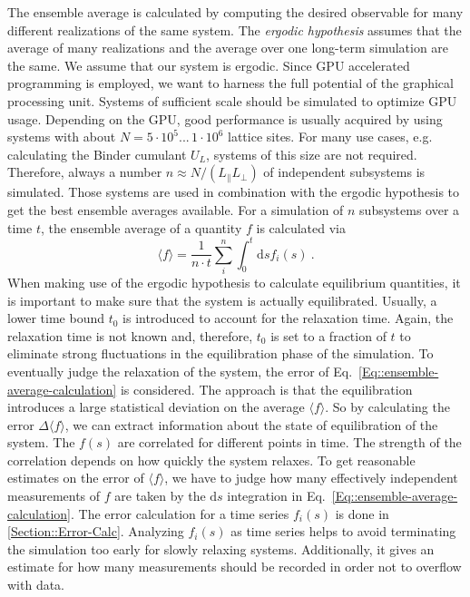 	The ensemble average is calculated by computing the desired observable for many different realizations of the same system. The \textit{ergodic hypothesis} assumes that the average of many realizations and the average over one long-term simulation are the same. We assume that our system is ergodic. Since GPU accelerated programming is employed, we want to harness the full potential of the graphical processing unit. Systems of sufficient scale should be simulated to optimize GPU usage. Depending on the GPU, good performance is usually acquired by using systems with about $N=  5 \cdot 10^5...\,1 \cdot 10^6$ lattice sites. For many use cases, e.g. calculating the Binder cumulant $U_L$, systems of this size are not required. Therefore, always a number $n \approx	N /	(L_\parallel L_\perp)$ of independent subsystems is simulated. Those systems are used in combination with the ergodic hypothesis to get the best ensemble averages available. For a simulation of $n$ subsystems over a time $t$, the ensemble average of a quantity $f$ is calculated via
	\begin{equation} \label{Eq::ensemble-average-calculation}
		\langle f \rangle = \frac{1}{n \cdot t} \sum_i^n \int_0^{t} \text{d}s f_i(s)~.
	\end{equation}
	 When making use of the ergodic hypothesis to calculate equilibrium quantities, it is important to make sure that the system is actually equilibrated. Usually, a lower time bound $t_0$ is introduced to account for the relaxation time. Again, the relaxation time is not known and, therefore, $t_0$ is set to a fraction of $t$ to eliminate strong fluctuations in the equilibration phase of the simulation. To eventually judge the relaxation of the system, the error of Eq.~\eqref{Eq::ensemble-average-calculation} is considered. The approach is that the equilibration introduces a large statistical deviation on the average $\langle f \rangle$. So by calculating the error $\Delta \langle f \rangle $, we can extract information about the state of equilibration of the system. The $f(s)$ are correlated for different points in time. The strength of the correlation depends on how quickly the system relaxes. To get reasonable estimates on the error of $\langle f \rangle$, we have to judge how many effectively independent measurements of $f$ are taken by the $\text{d}s$ integration in Eq.~\eqref{Eq::ensemble-average-calculation}. The error calculation for a time series $f_i(s)$ is done in  \autoref{Section::Error-Calc}. Analyzing $f_i(s)$ as time series helps to avoid terminating the simulation too early for slowly relaxing systems. Additionally, it gives an estimate for how many measurements should be recorded in order not to overflow with data. \\
	 
